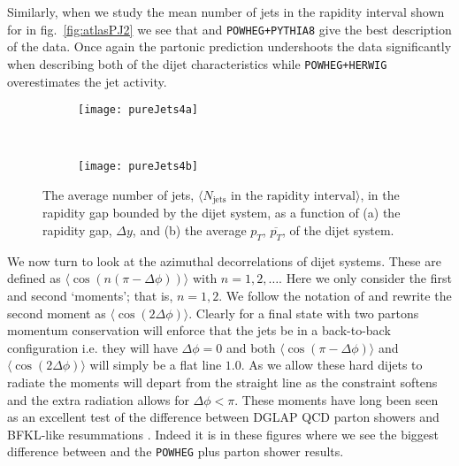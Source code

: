 	Similarly, when we study the mean number of jets in the rapidity interval shown for in
	fig.~\eqref{fig:atlasPJ2} we see that \HEJA and \texttt{POWHEG+PYTHIA8} give the best
	description of the data.  Once again the partonic \HEJ prediction undershoots the data
	significantly when describing both of the dijet characteristics while \texttt{POWHEG+HERWIG}
	overestimates the jet activity.

	\begin{figure}[bth]
		\begin{subfigure}[b]{0.48\textwidth}
			\texttt{[image: pureJets4a]}
			\caption{}
			\label{fig:}
		\end{subfigure}
		~
		\begin{subfigure}[b]{0.48\textwidth}
			\texttt{[image: pureJets4b]}
			\caption{}
			\label{fig:}
		\end{subfigure}
		\caption{The average number of jets, $\langle N_{\text{jets}}
		\text{ in the rapidity interval}\rangle$, in the rapidity gap
		         bounded by the dijet system, as a function of (a) the
		         rapidity gap, $\Delta y$, and (b) the average $p_T$,
		         $\overline{p_T}$, of the dijet system.}
		\label{fig:atlasPJ2}
	\end{figure}

	We now turn to look at the azimuthal decorrelations of dijet systems.  These are defined
	as $\langle\cos(n(\pi-\Delta\phi))\rangle$ with $n=1, 2, \ldots$.  Here we only consider
	the first and second `moments'; that is, $n=1, 2$.  We follow the notation of \cite{Aad:2014pua}
	and rewrite the second moment as $\langle\cos(2\Delta\phi)\rangle$.  Clearly for a final state
	with two partons momentum conservation will enforce that the jets be in a back-to-back configuration
	i.e. they will have $\Delta \phi=0$ and both $\langle\cos(\pi-\Delta\phi)\rangle$ and
	$\langle\cos(2\Delta\phi)\rangle$ will simply be a flat line $1.0$.  As we allow these hard
	dijets to radiate the moments will depart from the straight line as the constraint softens
	and the extra radiation allows for $\Delta\phi<\pi$.  These moments have long been seen
	as an excellent test of the difference between DGLAP QCD parton showers and BFKL-like
	resummations \cite{Ducloue:2012bm}.  Indeed it is in these figures where we see the biggest
	difference between \HEJ and the \texttt{POWHEG} plus parton shower results.

